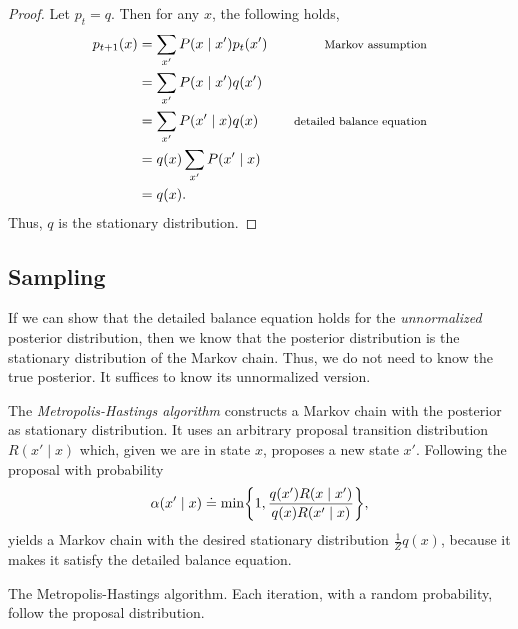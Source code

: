 \begin{proof}
  Let $p_t = q$. Then for any $x$, the following holds,
  \begin{align*}
    p_{t+1}(x) &= \sum_{x'} P(x\mid x')p_t(x') & \text{\footnotesize Markov assumption} \\
    &= \sum_{x'} P(x\mid x') q(x') \\
    &= \sum_{x'} P(x'\mid x) q(x) & \text{\footnotesize detailed balance equation} \\
    &= q(x) \sum_{x'} P(x' \mid x) \\
    &= q(x)
  .\end{align*}
  Thus, $q$ is the stationary distribution.
\end{proof}

\subsection{Sampling}

If we can show that the detailed balance equation holds for the
\textit{unnormalized} posterior distribution, then we know that the posterior
distribution is the stationary distribution of the Markov chain. Thus, we do not need to know the true posterior. It suffices
to know its unnormalized version.

The \textit{Metropolis-Hastings algorithm} constructs a Markov chain with the
posterior as stationary distribution. It uses an arbitrary proposal transition
distribution $R(x'\mid x)$ which, given we are in state $x$, proposes a new
state $x'$. Following the proposal with probability \[
  \alpha(x'\mid x) \doteq \min \lft\{  1, \frac{q(x')R(x\mid x')}{q(x)R(x'\mid x)} \rgt\}
,\]
yields a Markov chain with the desired stationary distribution
$\frac{1}{Z}q(x)$, because it makes it satisfy the detailed balance equation.

\begin{algorithm}
  \caption{The Metropolis-Hastings algorithm. Each iteration, with a random
  probability, follow the proposal distribution.}

  \begin{algorithmic}[1]
        \EndIf
      \EndFor
    \EndFunction
  \end{algorithmic}
\end{algorithm}

